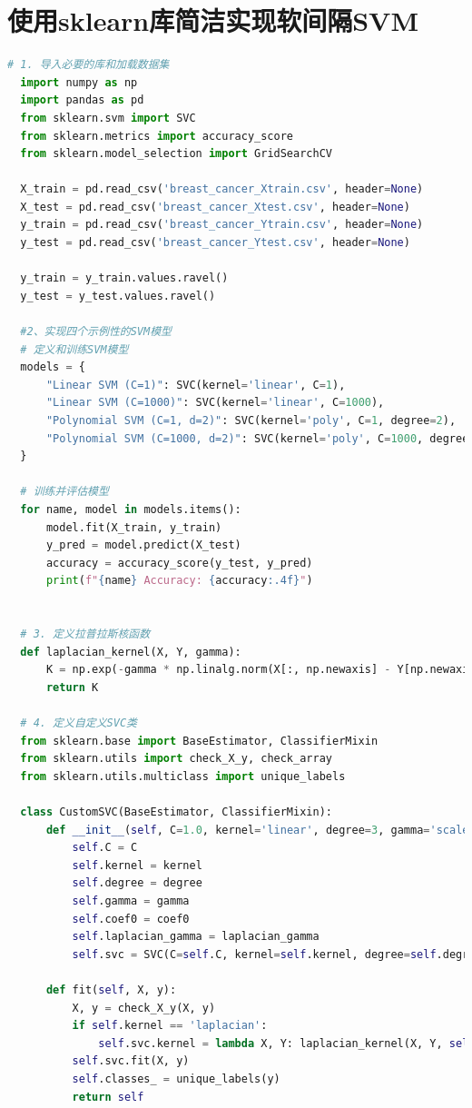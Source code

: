 \documentclass[12pt]{article}
\begin{document}
\section{使用sklearn库简洁实现软间隔SVM}
\begin{lstlisting}[language=python]
  # 1. 导入必要的库和加载数据集
  import numpy as np
  import pandas as pd
  from sklearn.svm import SVC
  from sklearn.metrics import accuracy_score
  from sklearn.model_selection import GridSearchCV
  
  X_train = pd.read_csv('breast_cancer_Xtrain.csv', header=None)
  X_test = pd.read_csv('breast_cancer_Xtest.csv', header=None)
  y_train = pd.read_csv('breast_cancer_Ytrain.csv', header=None)
  y_test = pd.read_csv('breast_cancer_Ytest.csv', header=None)
  
  y_train = y_train.values.ravel()
  y_test = y_test.values.ravel()
  
  #2、实现四个示例性的SVM模型
  # 定义和训练SVM模型
  models = {
      "Linear SVM (C=1)": SVC(kernel='linear', C=1),
      "Linear SVM (C=1000)": SVC(kernel='linear', C=1000),
      "Polynomial SVM (C=1, d=2)": SVC(kernel='poly', C=1, degree=2),
      "Polynomial SVM (C=1000, d=2)": SVC(kernel='poly', C=1000, degree=2)
  }
  
  # 训练并评估模型
  for name, model in models.items():
      model.fit(X_train, y_train)
      y_pred = model.predict(X_test)
      accuracy = accuracy_score(y_test, y_pred)
      print(f"{name} Accuracy: {accuracy:.4f}")
  
  
  # 3. 定义拉普拉斯核函数
  def laplacian_kernel(X, Y, gamma):
      K = np.exp(-gamma * np.linalg.norm(X[:, np.newaxis] - Y[np.newaxis, :], axis=2))
      return K
  
  # 4. 定义自定义SVC类
  from sklearn.base import BaseEstimator, ClassifierMixin
  from sklearn.utils import check_X_y, check_array
  from sklearn.utils.multiclass import unique_labels
  
  class CustomSVC(BaseEstimator, ClassifierMixin):
      def __init__(self, C=1.0, kernel='linear', degree=3, gamma='scale', coef0=0.0, laplacian_gamma=1.0):
          self.C = C
          self.kernel = kernel
          self.degree = degree
          self.gamma = gamma
          self.coef0 = coef0
          self.laplacian_gamma = laplacian_gamma
          self.svc = SVC(C=self.C, kernel=self.kernel, degree=self.degree, gamma=self.gamma, coef0=self.coef0)
      
      def fit(self, X, y):
          X, y = check_X_y(X, y)
          if self.kernel == 'laplacian':
              self.svc.kernel = lambda X, Y: laplacian_kernel(X, Y, self.laplacian_gamma)
          self.svc.fit(X, y)
          self.classes_ = unique_labels(y)
          return self
      

\end{lstlisting}
\end{document}
